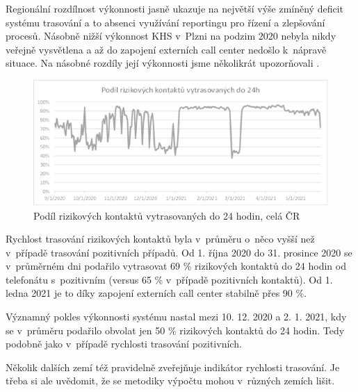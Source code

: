 Regionální rozdílnost výkonnosti jasně ukazuje na největší výše zmíněný deficit systému trasování a to absenci využívání reportingu pro řízení a zlepšování procesů. Násobně nižší výkonnost KHS v~Plzni na podzim 2020 nebyla nikdy veřejně vysvětlena a až do zapojení externích call center nedošlo k~nápravě situace. Na násobné rozdíly její výkonnosti jsme několikrát upozorňovali \cite{tr_bisop03}.

\begin{figure}[ht]
    \centering
    \includegraphics[width=1\textwidth]{./pic/d.eps}
    \caption{Podíl rizikových kontaktů vytrasovaných do 24 hodin, celá ČR}
    \label{fig:rizikove24}
\end{figure}

Rychlost trasování rizikových kontaktů byla v~průměru o~něco vyšší než v~případě trasování pozitivních případů. Od 1. října 2020 do 31. prosince 2020 se v~průměrném dni podařilo vytrasovat 69 \% rizikových kontaktů do 24 hodin od telefonátu s~pozitivním (versus 65 \% v~případě pozitivních kontaktů). Od 1. ledna 2021 je to díky zapojení externích call center stabilně přes 90 \%.

Významný pokles výkonnosti systému nastal mezi 10. 12. 2020 a 2. 1. 2021, kdy se v~průměru podařilo obvolat jen 50 \% rizikových kontaktů do 24 hodin. Tedy podobně jako v~případě rychlosti trasování pozitivních.

Několik dalších zemí též pravidelně zveřejňuje indikátor rychlosti trasování. Je třeba si ale uvědomit, že se metodiky výpočtu mohou v~různých zemích lišit.

